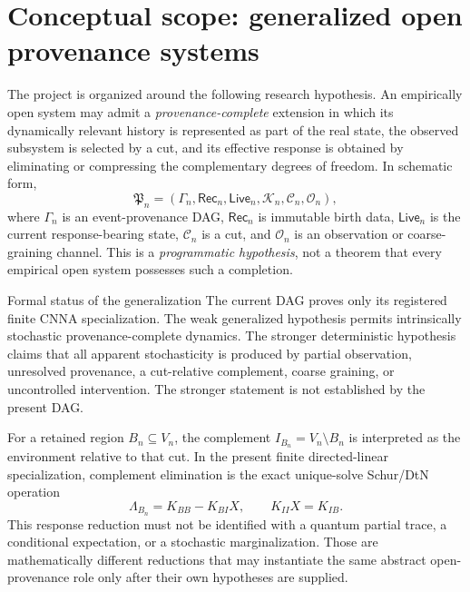 \section*{Conceptual scope: generalized open provenance systems}

The project is organized around the following research hypothesis.  An empirically open system may admit a \emph{provenance-complete} extension in which its dynamically relevant history is represented as part of the real state, the observed subsystem is selected by a cut, and its effective response is obtained by eliminating or compressing the complementary degrees of freedom.  In schematic form,
\[
  \mathfrak P_n=(\Gamma_n,\mathsf{Rec}_n,\mathsf{Live}_n,\mathcal K_n,\mathcal C_n,\mathcal O_n),
\]
where $\Gamma_n$ is an event-provenance DAG, $\mathsf{Rec}_n$ is immutable birth data, $\mathsf{Live}_n$ is the current response-bearing state, $\mathcal C_n$ is a cut, and $\mathcal O_n$ is an observation or coarse-graining channel.  This is a \emph{programmatic hypothesis}, not a theorem that every empirical open system possesses such a completion.

\begin{cnnaInfoBox}{Formal status of the generalization}
The current DAG proves only its registered finite CNNA specialization.  The weak generalized hypothesis permits intrinsically stochastic provenance-complete dynamics.  The stronger deterministic hypothesis claims that all apparent stochasticity is produced by partial observation, unresolved provenance, a cut-relative complement, coarse graining, or uncontrolled intervention.  The stronger statement is not established by the present DAG.
\end{cnnaInfoBox}

For a retained region $B_n\subseteq V_n$, the complement $I_{B_n}=V_n\setminus B_n$ is interpreted as the environment relative to that cut.  In the present finite directed-linear specialization, complement elimination is the exact unique-solve Schur/DtN operation
\[
  \Lambda_{B_n}=K_{BB}-K_{BI}X,\qquad K_{II}X=K_{IB}.
\]
This response reduction must not be identified with a quantum partial trace, a conditional expectation, or a stochastic marginalization.  Those are mathematically different reductions that may instantiate the same abstract open-provenance role only after their own hypotheses are supplied.

